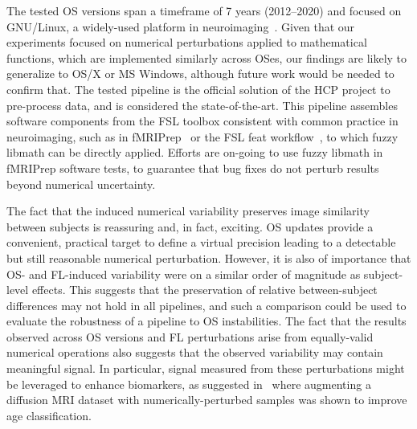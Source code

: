 The tested OS versions span a timeframe of 7 years
(2012--2020) and focused on GNU/Linux, a widely-used platform in neuroimaging~\cite{hanke2011neuroscience}.
Given that our experiments focused on numerical perturbations applied to mathematical functions, 
which are implemented similarly across OSes,
our findings are likely to generalize 
to OS/X or MS Windows, although future work would be needed to confirm that. 
The tested pipeline is the official solution of the HCP
project to pre-process data, and is considered the state-of-the-art. This pipeline
assembles software components from the FSL
toolbox consistent with common practice in neuroimaging, such as in
fMRIPrep~\cite{esteban2019fmriprep} or the FSL feat workflow~\cite{jenkinson2012fsl},
to which fuzzy libmath can be directly applied. 
 Efforts are on-going to use fuzzy libmath in fMRIPrep software tests,
 to guarantee that bug fixes do not perturb results beyond numerical uncertainty. 

The fact that the induced numerical variability preserves
image similarity between subjects is reassuring and, in fact, exciting. OS updates
provide a convenient, practical target to define a virtual precision
leading to a detectable but still reasonable numerical perturbation. However, it is also
of importance that OS- and FL-induced variability were on a similar
order of magnitude as subject-level effects. This suggests that the preservation of relative
between-subject differences may not hold in all pipelines, and such a comparison could be
used to evaluate the robustness of a pipeline to OS instabilities.
The fact that the results observed across OS versions and FL perturbations arise
from equally-valid numerical operations also suggests that the observed variability
may contain meaningful signal.
In particular, signal measured from these perturbations might be leveraged to
enhance biomarkers, as suggested in~\cite{kiar2021data} where augmenting a
diffusion MRI dataset with numerically-perturbed samples was shown to
improve age classification.
